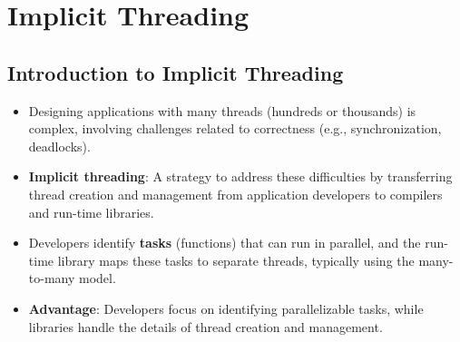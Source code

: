 \section{Implicit Threading}\label{sec:4.5}

\subsection{Introduction to Implicit Threading}
\begin{itemize}
    \item Designing applications with many threads (hundreds or thousands) is complex, involving challenges related to correctness (e.g., synchronization, deadlocks).
    \item \textbf{Implicit threading}: A strategy to address these difficulties by transferring thread creation and management from application developers to compilers and run-time libraries.
    \item Developers identify \textbf{tasks} (functions) that can run in parallel, and the run-time library maps these tasks to separate threads, typically using the many-to-many model.
    \item \textbf{Advantage}: Developers focus on identifying parallelizable tasks, while libraries handle the details of thread creation and management.
\end{itemize}

